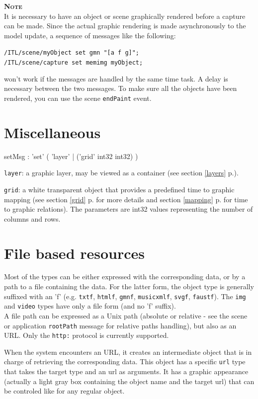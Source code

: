 \documentclass[a4paper,twoside]{report}
\newcommand{\sublevel}[1]	{\section{#1}}
\newcommand{\fullref}[1]	{\ref{#1} p.\pageref{#1}}
\newcommand{\OSC}[1]		{\texttt{#1}}
\newcommand{\note}	[1]		{\vspace{2mm}\textbf{\hspace{-1.03cm}\textbf{\textsc{Note #1}}}}
\let\olditemize\itemize
\let\oldenditemize\enditemize
\renewenvironment{itemize} 	{\olditemize \setlength{\itemsep}{1mm}}{\oldenditemize}
\newcommand{\sample}	[1]			{\vspace{-2mm}\begin{center}\colorbox{mygrey}{
								\begin{minipage}[t]{0.9\columnwidth} 
								{\small \texttt{#1}}
								\end{minipage}}\end{center}}
\begin{document}
\note{} \\
It is necessary to have an object or scene graphically rendered before a capture can be made. Since the actual graphic rendering is made asynchronously to the model update, a sequence of messages like the following:
\sample{/ITL/scene/myObject set gmn "[a f g]";\\
/ITL/scene/capture set memimg myObject;
}
won't work if the messages are handled by the same time task. A delay is necessary between the two messages. To make sure all the objects have been rendered, you can use the scene \OSC{endPaint} event.


\sublevel{Miscellaneous}
\label{miscscore}

\begin{rail}
setMsg : 'set' (
	'layer'  |
	('grid' int32 int32)
)
\end{rail}

\begin{itemize}
\item \OSC{layer}: a graphic layer, may be viewed as a container (see section \fullref{layers}).
\item \OSC{grid}: a white transparent object that provides a predefined time to graphic mapping (see section \fullref{grid} for more details and section \fullref{mapping} for time to graphic relations). The parameters are int32 values representing the number of columns and rows.
\end{itemize}


\sublevel{File based resources}
\label{filebasedrsrc}

Most of the types can be either expressed with the corresponding data, or by a path to a file containing the data. For the latter form, the object type is generally suffixed with an 'f' (e.g. \OSC{txtf}, \OSC{htmlf}, \OSC{gmnf}, \OSC{musicxmlf}, \OSC{svgf}, \OSC{faustf}). The \OSC{img} and  \OSC{video} types have only a file form (and no 'f' suffix). \\
A file path can be expressed as a Unix path (absolute or relative - see the scene or application \OSC{rootPath} message for relative paths handling), but also as an URL.
Only the \OSC{http:} protocol is currently supported.

When the system encounters an URL, it creates an intermediate object that is in charge of retrieving the corresponding data. This object has a specific \OSC{url} type that takes the target type and an url as arguments. It has a graphic appearance (actually a light gray box containing the object name and the target url) that can be controled like for any regular object.
\end{document}
